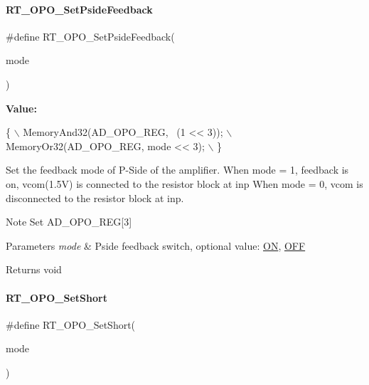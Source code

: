 \paragraph{\texorpdfstring{R\+T\+\_\+\+O\+P\+O\+\_\+\+Set\+Pside\+Feedback}{RT\_OPO\_SetPsideFeedback}}
{\footnotesize\ttfamily \#define R\+T\+\_\+\+O\+P\+O\+\_\+\+Set\+Pside\+Feedback(\begin{DoxyParamCaption}\item[{}]{mode }\end{DoxyParamCaption})}

{\bfseries Value\+:}
\begin{DoxyCode}
\{                                       \(\backslash\)
        MemoryAnd32(AD\_OPO\_REG, ~(1 << 3)); \(\backslash\)
        MemoryOr32(AD\_OPO\_REG, mode << 3);  \(\backslash\)
    \}
\end{DoxyCode}


Set the feedback mode of P-\/\+Side of the amplifier. When mode = 1, feedback is on, vcom(1.\+5V) is connected to the resistor block at inp When mode = 0, vcom is disconnected to the resistor block at inp. 

\begin{DoxyNote}{Note}
Set A\+D\+\_\+\+O\+P\+O\+\_\+\+R\+EG\mbox{[}3\mbox{]} 
\end{DoxyNote}

\begin{DoxyParams}{Parameters}
{\em mode} & Pside feedback switch, optional value\+: \mbox{\hyperlink{a00020_ab43e533f3793920486fb81c580f71564a977d478dacaae531f95695750d1e9d03}{ON}}, \mbox{\hyperlink{a00020_ab43e533f3793920486fb81c580f71564aac132f2982b98bcaa3445e535a03ff75}{O\+FF}} \\
\hline
\end{DoxyParams}
\begin{DoxyReturn}{Returns}
void 
\end{DoxyReturn}
\mbox{\label{a00002_aef61e41bd9fb19c3690ff5a25fb9893d}} 
\paragraph{\texorpdfstring{R\+T\+\_\+\+O\+P\+O\+\_\+\+Set\+Short}{RT\_OPO\_SetShort}}
{\footnotesize\ttfamily \#define R\+T\+\_\+\+O\+P\+O\+\_\+\+Set\+Short(\begin{DoxyParamCaption}\item[{}]{mode }\end{DoxyParamCaption})}

